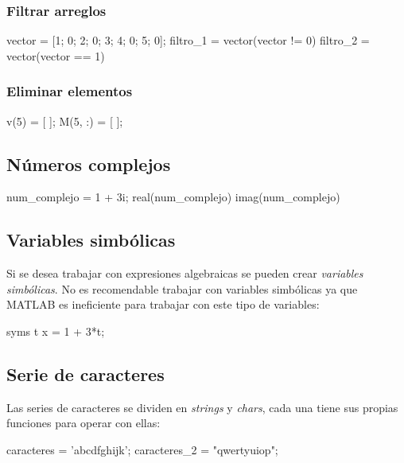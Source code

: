 \subsubsection{Filtrar arreglos}
\begin{verbatimg}
    vector = [1; 0; 2; 0; 3; 4; 0; 5; 0];
    filtro_1 = vector(vector != 0) %
    filtro_2 = vector(vector == 1) %
\end{verbatimg}

\subsubsection{Eliminar elementos}
\begin{verbatimg}
    v(5) = [ ];     %
    M(5, :) = [ ];  %
\end{verbatimg}

\subsection{Números complejos}
\begin{verbatimg}
    num_complejo = 1 + 3i;  %
    real(num_complejo)      %
    imag(num_complejo)      %
\end{verbatimg}

\subsection{Variables simbólicas}
Si se desea trabajar con expresiones algebraicas se pueden crear \emph{variables simbólicas}. No es recomendable trabajar con variables simbólicas ya que MATLAB es ineficiente para trabajar con este tipo de variables:

\begin{verbatimg}
    syms t          %
    x = 1 + 3*t;    %
\end{verbatimg}

\subsection{Serie de caracteres}
Las series de caracteres se dividen en \emph{strings} y \emph{chars}, cada una tiene sus propias funciones para operar con ellas:
\begin{verbatimg}
    caracteres = 'abcdfghijk';      %
    caracteres_2 = "qwertyuiop";    %
\end{verbatimg}

